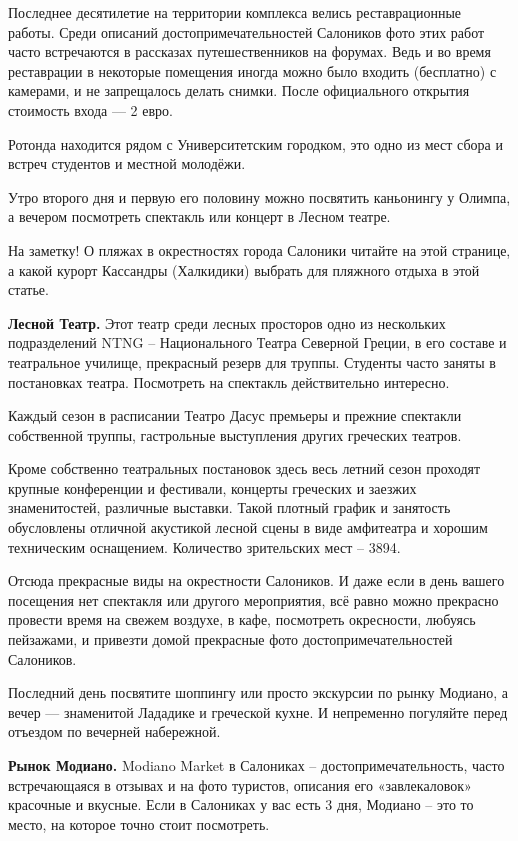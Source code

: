 Последнее десятилетие на территории комплекса велись реставрационные работы. Среди описаний достопримечательностей Салоников фото этих работ часто встречаются в рассказах путешественников на форумах. Ведь и во время реставрации в некоторые помещения иногда можно было входить (бесплатно) с камерами, и не запрещалось делать снимки. После официального открытия стоимость входа — 2 евро.

Ротонда находится рядом с Университетским городком, это одно из мест сбора и встреч студентов и местной молодёжи.

Утро второго дня и первую его половину можно посвятить каньонингу у Олимпа, а вечером посмотреть спектакль или концерт в Лесном театре.

На заметку! О пляжах в окрестностях города Салоники читайте на этой странице, а какой курорт Кассандры (Халкидики) выбрать для пляжного отдыха в этой статье.

\textbf{Лесной Театр.}  Этот театр среди лесных просторов одно из нескольких подразделений NTNG – Национального Театра Северной Греции, в его составе и театральное училище, прекрасный резерв для труппы. Студенты часто заняты в постановках театра. Посмотреть на спектакль действительно интересно.

Каждый сезон в расписании Театро Дасус премьеры и прежние спектакли собственной труппы, гастрольные выступления других греческих театров.

Кроме собственно театральных постановок здесь весь летний сезон проходят крупные конференции и фестивали, концерты греческих и заезжих знаменитостей, различные выставки. Такой плотный график и занятость обусловлены отличной акустикой лесной сцены в виде амфитеатра и хорошим техническим оснащением. Количество зрительских мест – 3894.

Отсюда прекрасные виды на окрестности Салоников. И даже если в день вашего посещения нет спектакля или другого мероприятия, всё равно можно прекрасно провести время на свежем воздухе, в кафе, посмотреть окресности, любуясь пейзажами, и привезти домой прекрасные фото достопримечательностей Салоников.

Последний день посвятите шоппингу или просто экскурсии по рынку Модиано, а вечер — знаменитой Лададике и греческой кухне. И непременно погуляйте перед отъездом по вечерней набережной.

\textbf{Рынок Модиано.} Modiano Market в Салониках – достопримечательность, часто встречающаяся в отзывах и на фото туристов, описания его «завлекаловок» красочные и вкусные. Если в Салониках у вас есть 3 дня, Модиано – это то место, на которое точно стоит посмотреть.

